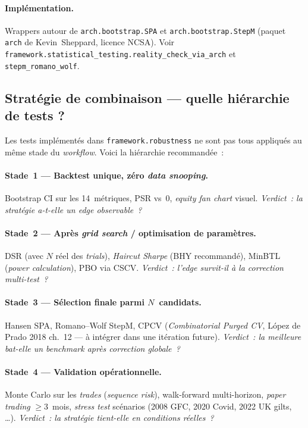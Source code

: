 \paragraph{Implémentation.} Wrappers autour de \texttt{arch.bootstrap.SPA} et \texttt{arch.bootstrap.StepM} (paquet \texttt{arch} de Kevin~Sheppard, licence NCSA). Voir \texttt{framework.statistical\_testing.reality\_check\_via\_arch} et \texttt{stepm\_romano\_wolf}.

\subsection{Stratégie de combinaison --- quelle hiérarchie de tests ?}
\label{app:hierarchy}

Les tests implémentés dans \texttt{framework.robustness} ne sont pas tous appliqués au même stade du \emph{workflow}. Voici la hiérarchie recommandée~:

\paragraph{Stade~1 --- Backtest unique, zéro \emph{data snooping}.} Bootstrap CI sur les 14~métriques, PSR vs~0, \emph{equity fan chart} visuel. \textit{Verdict~: la stratégie a-t-elle un \emph{edge} observable~?}

\paragraph{Stade~2 --- Après \emph{grid search} / optimisation de paramètres.} DSR (avec $N$ réel des \emph{trials}), \emph{Haircut Sharpe} (BHY recommandé), MinBTL (\emph{power calculation}), PBO via CSCV. \textit{Verdict~: l'\emph{edge} survit-il à la correction multi-test~?}

\paragraph{Stade~3 --- Sélection finale parmi $N$~candidats.} Hansen SPA, Romano--Wolf StepM, CPCV (\emph{Combinatorial Purged CV}, L\'opez de Prado 2018 ch.~12 --- à intégrer dans une itération future). \textit{Verdict~: la meilleure bat-elle un benchmark après correction globale~?}

\paragraph{Stade~4 --- Validation opérationnelle.} Monte Carlo sur les \emph{trades} (\emph{sequence risk}), walk-forward multi-horizon, \emph{paper trading} $\geq 3$~mois, \emph{stress test} scénarios (2008 GFC, 2020 Covid, 2022 UK gilts, \ldots). \textit{Verdict~: la stratégie tient-elle en conditions réelles~?}

